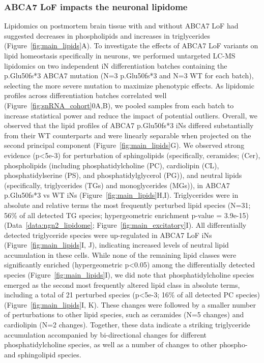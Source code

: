 \subsubsection{ABCA7 LoF impacts the neuronal lipidome}
Lipidomics on postmortem brain tissue with and without ABCA7 LoF had suggested decreases in phospholipids and increases in triglycerides (Figure~\ref{fig:main_lipids}A). To investigate the effects of ABCA7 LoF variants on lipid homeostasis specifically in neurons, we performed untargeted LC-MS lipidomics on two independent iN differentiation batches containing the p.Glu50fs*3 ABCA7 mutation (N=3 p.Glu50fs*3 and N=3 WT for each batch), selecting the more severe mutation to maximize phenotypic effects. As lipidomic profiles across differentiation batches correlated well (Figure~\ref{fig:snRNA_cohort}0A,B), we pooled samples from each batch to increase statistical power and reduce the impact of potential outliers. Overall, we observed that the lipid profiles of ABCA7 p.Glu50fs*3 iNs differed substantially from their WT counterparts and were linearly separable when projected on the second principal component (Figure~\ref{fig:main_lipids}G). We observed strong evidence (p<5e-3) for perturbation of sphingolipids (specifically, ceramides; (Cer), phospholipids (including phosphatidylcholine (PC), cardiolipin (CL), phosphatidylserine (PS), and phosphatidylglycerol (PG)), and neutral lipids (specifically, triglycerides (TGs) and monoglycerides (MGs)), in ABCA7 p.Glu50fs*3 vs WT iNs (Figure~\ref{fig:main_lipids}H,I). 
Triglycerides were in absolute and relative terms the most frequently perturbed lipid species (N=31; 56\% of all detected TG species; hypergeometric enrichment p-value = 3.9e-15)(Data~\ref{data:ngn2_lipidome}; Figure~\ref{fig:main_excitatory}I). All differentially detected triglyceride species were up-regulated in ABCA7 LoF iNs (Figure~\ref{fig:main_lipids}I, J), indicating increased levels of neutral lipid accumulation in these cells. While none of the remaining lipid classes were significantly enriched (hypergeometric p<0.05) among the differentially detected species (Figure~\ref{fig:main_lipids}I), we did note that phosphatidylcholine species emerged as the second most frequently altered lipid class in absolute terms, including a total of 21 perturbed species (p<5e-3; 16\% of all detected PC species)(Figure~\ref{fig:main_lipids}I, K). These changes were followed by a smaller number of perturbations to other lipid species, such as ceramides (N=5 changes) and cardiolipin (N=2 changes). Together, these data indicate a striking triglyceride accumulation accompanied by bi-directional changes for different phosphatidylcholine species, as well as a number of changes to other phospho- and sphingolipid species. 

